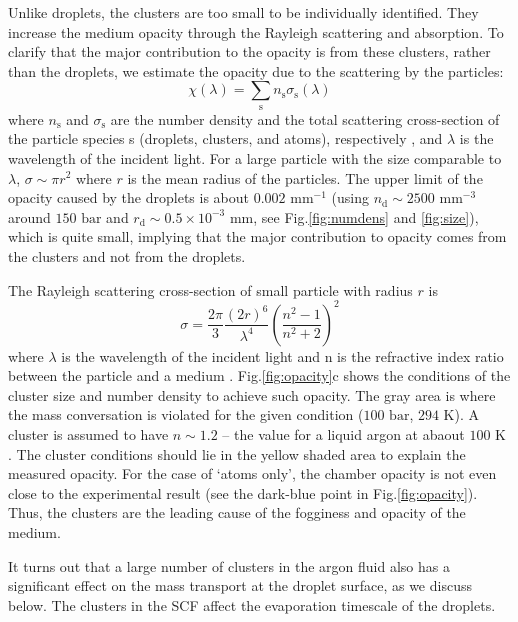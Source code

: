 Unlike droplets, the clusters are too small to be individually identified. They increase the medium opacity through the Rayleigh scattering and absorption. To clarify that the major contribution to the opacity is from these clusters, rather than the droplets, we estimate the opacity due to the scattering by the particles:
\begin{equation}
\chi \left( \lambda \right) = \sum_{\text{s}} n_{\text{s}} \sigma_{\text{s}} \left( \lambda \right)
\end{equation}
where $n_\text{s}$ and $\sigma_\text{s}$ are the number density and the total scattering cross-section of the particle species s (droplets, clusters, and atoms), respectively \cite{fivsak2016rayleigh, hulst1981light, howell2020thermal}, and $\lambda$ is the wavelength of the incident light. For a large particle with the size comparable to $\lambda$, $\sigma \sim \pi r^2$ where $r$ is the mean radius of the particles. The upper limit of the opacity caused by the droplets is about $0.002 \text{ mm}^{-1}$ (using $n_\text{d} \sim 2500 \text{ mm}^{-3}$ around $150 \text{ bar}$ and $r_\text{d} \sim 0.5 \times 10^{-3} \text{ mm}$, see Fig.\ref{fig:numdens} and \ref{fig:size}), which is quite small, implying that the major contribution to opacity comes from the clusters and not from the droplets.

The Rayleigh scattering cross-section of small particle with radius $r$ is
\begin{equation}
\sigma = \frac{2 \pi}{3} \frac{\left( 2 r \right)^{6}}{\lambda^{4}}\left( \frac{n^{2}-1}{n^{2}+2} \right)^{2}
\end{equation}
where $\lambda$ is the wavelength of the incident light and n is the refractive index ratio between the particle and a medium \cite{howell2020thermal}. Fig.\ref{fig:opacity}c shows the conditions of the cluster size and number density to achieve such opacity. The gray area is  where the mass conversation is violated for the given condition ($100 \text{ bar}$, $294 \text{ K}$). A cluster is assumed to have $n \sim 1.2$ – the value for a liquid argon at abaout $100 \text{ K}$ \cite{hanna2010equation}. The cluster conditions should lie in the yellow shaded area to explain the measured opacity. For the case of ‘atoms only’, the chamber opacity is not even close to the experimental result (see the dark-blue point in Fig.\ref{fig:opacity}). Thus, the clusters are the leading cause of the fogginess and opacity of the medium.

It turns out that a large number of clusters in the argon fluid also has a significant effect on the mass transport at the droplet surface, as we discuss below. The clusters in the SCF affect the evaporation timescale of the droplets.



